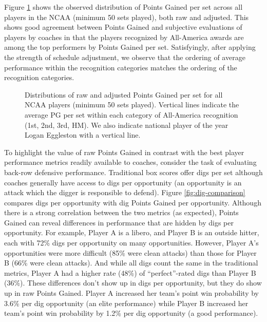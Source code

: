 \documentclass[USenglish]{article}
\theoremstyle{dgthm}
\theoremstyle{dgdef}
\begin{document}
Figure \ref{fig:avca-all-americans} shows the observed distribution of Points Gained per set across all players in the NCAA (minimum 50 sets played), both raw and adjusted. This shows good agreement between Points Gained and subjective evaluations of players by coaches in that the players recognized by All-America awards are among the top performers by Points Gained per set. Satisfyingly, after applying the strength of schedule adjustment, we observe that the ordering of average performance within the recognition categories matches the ordering of the recognition categories.

\begin{figure}
    \centering
    \caption{Distributions of raw and adjusted Points Gained per set for all NCAA players (minimum 50 sets played). Vertical lines indicate the average PG per set within each category of All-America recognition (1st, 2nd, 3rd, HM). We also indicate national player of the year Logan Eggleston with a vertical line.}
    \label{fig:avca-all-americans}
\end{figure}

To highlight the value of raw Points Gained in contrast with the best player performance metrics readily available to coaches, consider the task of evaluating back-row defensive performance. Traditional box scores offer digs per set although coaches generally have access to digs per opportunity (an opportunity is an attack which the digger is responsible to defend). Figure \ref{fig:dig-comparison} compares digs per opportunity with dig Points Gained per opportunity. Although there is a strong correlation between the two metrics (as expected), Points Gained can reveal differences in performance that are hidden by digs per opportunity. For example, Player A is a libero, and Player B is an outside hitter, each with 72\% digs per opportunity on many opportunities. However, Player A's opportunities were more difficult (85\% were clean attacks) than those for Player B (66\% were clean attacks). And while all digs count the same in the traditional metrics, Player A had a higher rate (48\%) of ``perfect''-rated digs than Player B (36\%). These differences don't show up in digs per opportunity, but they do show up in raw Points Gained. Player A increased her team's point win probability by 3.6\% per dig opportunity (an elite performance) while Player B increased her team's point win probability by 1.2\% per dig opportunity (a good performance).
\end{document}
